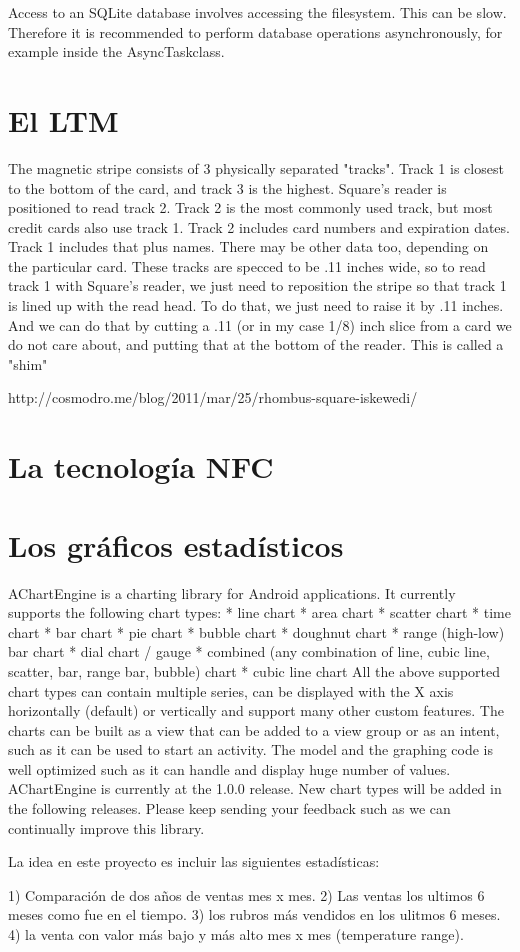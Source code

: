 Access to an SQLite database involves accessing the filesystem. This can be slow. Therefore it is recommended to perform database operations asynchronously, for example inside the AsyncTaskclass.

\section{El \ac{LTM}}
\label{sec:tpv.ltm}

The magnetic stripe consists of 3 physically separated "tracks". Track 1 is closest to the bottom of the card, and track 3 is the highest. Square's reader is positioned to read track 2. Track 2 is the most commonly used track, but most credit cards also use track 1. Track 2 includes card numbers and expiration dates. Track 1 includes that plus names. There may be other data too, depending on the particular card. These tracks are specced to be .11 inches wide, so to read track 1 with Square's reader, we just need to reposition the stripe so that track 1 is lined up with the read head. To do that, we just need to raise it by .11 inches. And we can do that by cutting a .11 (or in my case 1/8) inch slice from a card we do not care about, and putting that at the bottom of the reader. This is called a "shim"

http://cosmodro.me/blog/2011/mar/25/rhombus-square-iskewedi/

\section{La tecnolog\'ia \ac{NFC}}
\label{sec:tpv.nfc}



\section{Los gr\'aficos estad\'isticos}
\label{sec:tpv.graphs}

AChartEngine is a charting library for Android applications. It currently supports the following chart types:
   * line chart
   * area chart
   * scatter chart
   * time chart
   * bar chart
   * pie chart
   * bubble chart
   * doughnut chart
   * range (high-low) bar chart
   * dial chart / gauge
   * combined (any combination of line, cubic line, scatter, bar, range bar, bubble) chart
   * cubic line chart
All the above supported chart types can contain multiple series, can be displayed with the X axis horizontally (default) or vertically and support many other custom features. The charts can be built as a view that can be added to a view group or as an intent, such as it can be used to start an activity.
The model and the graphing code is well optimized such as it can handle and display huge number of values.
AChartEngine is currently at the 1.0.0 release. New chart types will be added in the following releases. Please keep sending your feedback such as we can continually improve this library.

La idea en este proyecto es incluir las siguientes estadísticas:

1) Comparaci\'on de dos años de ventas mes x mes.
2) Las ventas los ultimos 6 meses como fue en el tiempo.
3) los rubros más vendidos en los ulitmos 6 meses.
4) la venta con valor más bajo y más alto mes x mes (temperature range).
